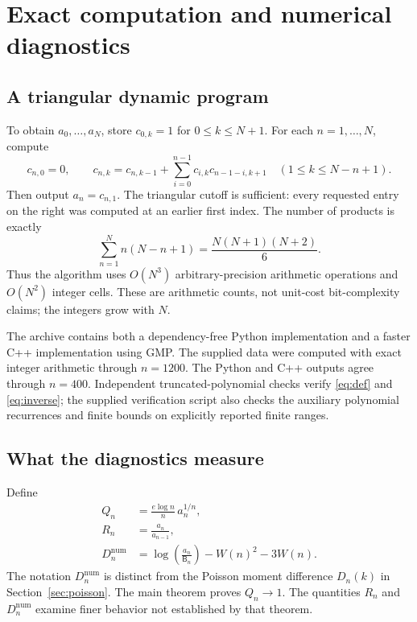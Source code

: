 \documentclass[11pt]{article}
\numberwithin{equation}{section}
\theoremstyle{remark}
\begin{document}
\section{Exact computation and numerical diagnostics}\label{sec:numerics}

\subsection{A triangular dynamic program}

To obtain $a_0,\ldots,a_N$, store $c_{0,k}=1$ for $0\le k\le N+1$.
For each $n=1,\ldots,N$, compute
\[
 c_{n,0}=0,\qquad
 c_{n,k}=c_{n,k-1}+\sum_{i=0}^{n-1}c_{i,k}c_{n-1-i,k+1}
 \quad(1\le k\le N-n+1).
\]
Then output $a_n=c_{n,1}$. The triangular cutoff is sufficient: every
requested entry on the right was computed at an earlier first index.
The number of products is exactly
\[
 \sum_{n=1}^N n(N-n+1)=\frac{N(N+1)(N+2)}6.
\]
Thus the algorithm uses $O(N^3)$ arbitrary-precision arithmetic
operations and $O(N^2)$ integer cells. These are arithmetic counts, not
unit-cost bit-complexity claims; the integers grow with $N$.

The archive contains both a dependency-free Python implementation and
a faster C++ implementation using GMP. The supplied data were computed
with exact integer arithmetic through $n=1200$. The Python and C++
outputs agree through $n=400$. Independent truncated-polynomial checks
verify \eqref{eq:def} and \eqref{eq:inverse}; the supplied verification
script also checks the auxiliary polynomial recurrences and finite
bounds on explicitly reported finite ranges.

\subsection{What the diagnostics measure}

Define
\begin{align}
 Q_n&=\frac{e\log n}{n}\,a_n^{1/n},\label{eq:Q}\\
 R_n&=\frac{a_n}{a_{n-1}},\label{eq:R}\\
 D_n^{\mathrm{num}}
 &=\log\left(\frac{a_n}{\mathsf B_n}\right)-W(n)^2-3W(n).
 \label{eq:Dnum}
\end{align}
The notation $D_n^{\mathrm{num}}$ is distinct from the Poisson moment
difference $D_n(k)$ in Section~\ref{sec:poisson}. The main theorem proves
$Q_n\to1$. The quantities $R_n$ and $D_n^{\mathrm{num}}$ examine finer
behavior not established by that theorem.
\end{document}
